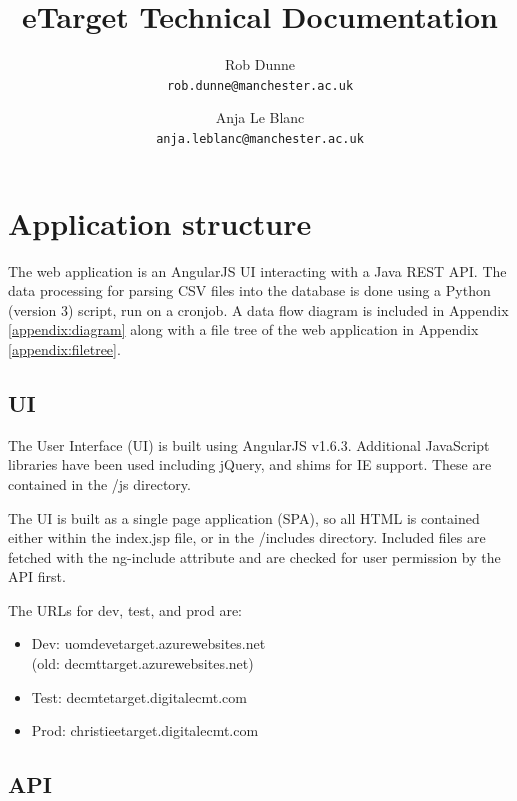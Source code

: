 \documentclass[10pt,a4paper,oneside]{article}
\begin{document}
\title{eTarget Technical Documentation}
\author{
	Rob Dunne\\
	\texttt{rob.dunne@manchester.ac.uk}
	\and
	Anja Le Blanc\\
	\texttt{anja.leblanc@manchester.ac.uk}
	}
\maketitle

\tableofcontents
\newpage

\section{Application structure}

	The web application is an AngularJS UI interacting with a Java REST API. The data processing for parsing CSV files into the database is done using a 
	Python (version 3) script, run on a cronjob. A data flow diagram is included in Appendix \ref{appendix:diagram} along with a file tree of the web application in Appendix \ref{appendix:filetree}.
	
	\subsection{UI}
	
	The User Interface (UI) is built using AngularJS v1.6.3. Additional JavaScript libraries have been used including jQuery, and shims for IE support. These are contained in the /js directory.
	
	The UI is built as a single page application (SPA), so all HTML is contained either within the index.jsp file, or in the /includes directory. Included files are fetched with the ng-include attribute and are checked for user permission by the API first.
	
	The URLs for dev, test, and prod are:
	\begin{itemize}
		\item Dev: uomdevetarget.azurewebsites.net \\(old: decmttarget.azurewebsites.net)
		\item Test: decmtetarget.digitalecmt.com
		\item Prod: christieetarget.digitalecmt.com
	\end{itemize}
	
	\subsection{API}
	
\end{document}
